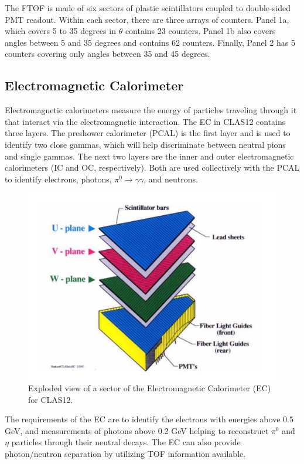 The FTOF is made of six sectors of plastic scintillators coupled to double-sided PMT readout. Within each sector, there are three arrays of counters. Panel 1a, which covers 5 to 35 degrees in $\theta$ contains 23 counters. Panel 1b also covers angles between 5 and 35 degrees and contains 62 counters. Finally, Panel 2 has 5 counters covering only angles between 35 and 45 degrees. 

\subsection{Electromagnetic Calorimeter}
Electromagnetic calorimeters measure the energy of particles traveling through it that interact via the electromagnetic interaction. The EC in CLAS12 contains three layers. The preshower calorimeter (PCAL) is the first layer and is used to identify two close gammas, which will help discriminate between neutral pions and single gammas. The next two layers are the inner and outer electromagnetic calorimeters (IC and OC, respectively). Both are used collectively with the PCAL to identify electrons, photons, $\pi^0 \rightarrow \gamma \gamma$, and neutrons.

\begin{figure}[h!]
	\centering
	\includegraphics[width=0.8\linewidth]{figures/ecal.png}
	\caption{Exploded view of a sector of the Electromagnetic Calorimeter (EC) for CLAS12. \cite{clasnote:EC_geo} }
	\label{fig:ecal}
\end{figure}

The requirements of the EC are to identify the electrons with energies above 0.5 GeV, and measurements of photons above 0.2 GeV helping to reconstruct $\pi^0$ and $\eta$ particles through their neutral decays. The EC can also provide photon/neutron separation by utilizing TOF information available.

